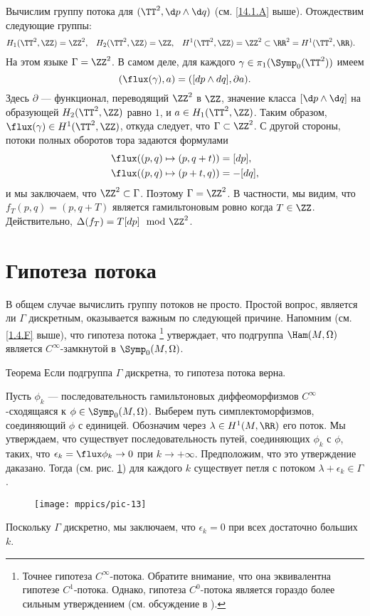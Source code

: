 Вычислим группу потока для $(\TT^2,\d p\wedge \d q)$ (см. \ref{14.1.A} выше).
Отождествим следующие группы: 
\begin{align*}
H_1(\TT^2,\ZZ)&=\ZZ^2,
&
H_2(\TT^2,\ZZ)&=\ZZ,
&
H^1(\TT^2,\ZZ)&=\ZZ^2
\subset
\RR^2=
H^1(\TT^2,\RR).
\end{align*}
На этом языке $\Gamma = \ZZ^2$.
В самом деле, для каждого $\gamma\in\pi_1(\Symp_0(\TT^2))$ имеем 
\[(\flux(\gamma), a) = ([dp \wedge dq], \partial a).\]
Здесь $\partial$ --- функционал, переводящий $\ZZ^2$ в $\ZZ$, значение класса $[\d p \wedge \d q]$ на образующей $H_2 (\TT^2,\ZZ)$ равно $1$, и $a \in H_1 (\TT^2, \ZZ)$.
Таким образом, $\flux(\gamma)\in H^1(\TT^2,\ZZ)$, откуда следует, что $\Gamma\subset \ZZ^2$.
С другой стороны, потоки полных оборотов тора задаются формулами 
\begin{align*}
\flux( (p, q) \mapsto (p , q+ t))
&=
[dp],
\\
\flux( (p, q) \mapsto (p+ t , q))
&=
-[dq],
\end{align*}
и мы заключаем, что $\ZZ^2 \subset  \Gamma$.
Поэтому $\Gamma = \ZZ^2$.
В частности, мы видим, что $f_T(p, q) = (p, q + T)$ является гамильтоновым ровно когда $T \in \ZZ$.
Действительно, $\Delta(f_T) = T[dp] \mod{\ZZ^2}$.

\section{Гипотеза потока}

В общем случае вычислить группу потоков не просто.
Простой вопрос, является ли $\Gamma$ дискретным, оказывается важным по следующей причине.
Напомним (см. \ref{1.4.F} выше), что гипотеза потока%
\footnote{Точнее гипотеза $C^\infty$-потока.
Обратите внимание, что она эквивалентна гипотезе $C^1$-потока.
Однако, гипотеза $C^0$-потока является гораздо более сильным утверждением (см. обсуждение в \cite{LMP1}).}
утверждает, что подгруппа $\Ham(M,\Omega)$ является $C^\infty$-замкнутой в $\Symp_0(M,\Omega)$.

\begin{thm}{Теорема}\label{14.2.A}
Если подгруппа $\Gamma$ дискретна, то гипотеза потока верна. 
\end{thm}

Пусть $\phi_k$ --- последовательность гамильтоновых диффеоморфизмов $C^\infty$-сходящаяся к $\phi\in\Symp_0(M,\Omega)$.
Выберем путь симплектоморфизмов, соединяющий $\phi$ с единицей.
Обозначим через $\lambda \in H^1 (M, \RR)$ его поток.
Мы утверждаем, что существует последовательность путей, соединяющих $\phi_k$ с $\phi$, 
таких, что $\epsilon_k=\flux \phi_k\to 0$ при $k\to +\infty$.
Предположим, что это утверждение даказано.
Тогда (см. рис. \ref{pic-13}) для каждого $k$ существует петля с потоком $\lambda + \epsilon_k\in \Gamma$.
\begin{figure}[ht!]
\centering
\texttt{[image: mppics/pic-13]}
\caption{}\label{pic-13}
\vskip0mm
\end{figure}
Поскольку $\Gamma$ дискретно, мы заключаем, что $\epsilon_k=0$ при всех достаточно больших $k$.



